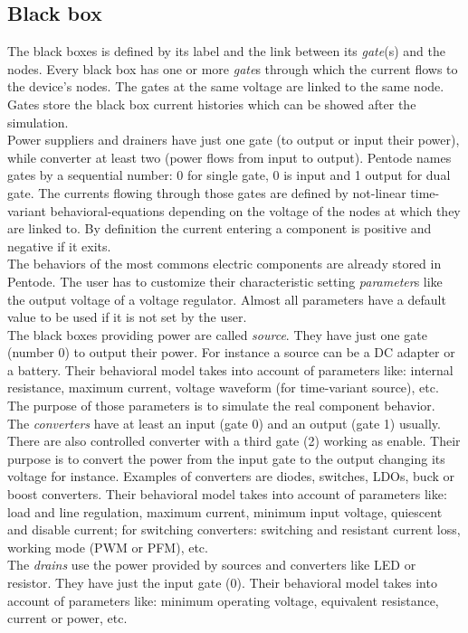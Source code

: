 \documentclass[12pt,a4paper]{book}
\begin{document}
\subsection{Black box}
The black boxes is defined by its label and the link between its \emph{gate}(s) and the nodes. Every black box has one or more \emph{gate}s through which the current flows to the device's nodes. The gates at the same voltage are linked to the same node. Gates store the black box current histories which can be showed after the simulation.\\
Power suppliers and drainers have just one gate (to output or input their power), while converter at least two (power flows from input to output). Pentode names gates by a sequential number: 0 for single gate, 0 is input and 1 output for dual gate. The currents flowing through those gates are defined by not-linear time-variant behavioral-equations depending on the voltage of the nodes at which they are linked to. By definition the current entering a component is positive and negative if it exits. \\
The behaviors of the most commons electric components are already stored in Pentode. The user has to customize their characteristic setting \emph{parameter}s like the output voltage of a voltage regulator. Almost all parameters have a default value to be used if it is not set by the user.\\
The black boxes providing power are called \emph{source}. They have just one gate (number  0) to output their power. For instance a source can be a DC adapter or a battery. Their behavioral model takes into account of parameters like: internal resistance, maximum current, voltage waveform (for time-variant source), etc. The purpose of those parameters is to simulate the real component behavior.\\
The \emph{converters} have at least an input (gate 0) and an output (gate 1) usually. There are also controlled converter with a third gate (2) working as enable. Their purpose is to convert the power from the input gate to the output changing its voltage for instance. Examples of converters are diodes, switches, LDOs, buck or boost converters. Their behavioral model takes into account of parameters like: load and line regulation, maximum current, minimum input voltage, quiescent and disable current; for switching converters: switching and resistant current loss, working mode (PWM or PFM), etc.\\
The \emph{drains} use the power provided by sources and converters like LED or resistor. They have just the input gate (0). Their behavioral model takes into account of parameters like: minimum operating voltage, equivalent resistance, current or power, etc.\\
\end{document}
